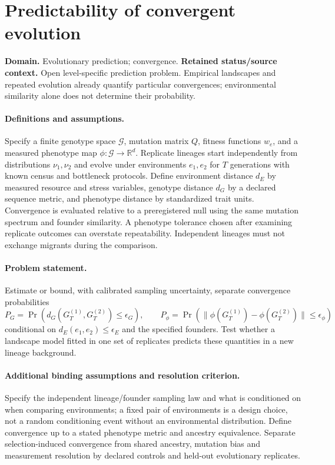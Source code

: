 \documentclass[11pt]{article}
\begin{document}
\section*{Predictability of convergent evolution}
\label{prob:158}
\label{rank:91}
\par\smallskip

\noindent\textbf{Domain.} Evolutionary prediction; convergence. \quad \textbf{Retained status/source context.} Open level-specific prediction problem. Empirical landscapes and repeated evolution already quantify particular convergences; environmental similarity alone does not determine their probability.
\paragraph{Definitions and assumptions.} Specify a finite genotype space $\mathcal G$, mutation matrix $Q$, fitness functions $w_e$, and a measured phenotype map $\phi:\mathcal G\to\mathbb{R}^d$. Replicate lineages start independently from distributions $\nu_1,\nu_2$ and evolve under environments $e_1,e_2$ for $T$ generations with known census and bottleneck protocols. Define environment distance $d_E$ by measured resource and stress variables, genotype distance $d_G$ by a declared sequence metric, and phenotype distance by standardized trait units. Convergence is evaluated relative to a preregistered null using the same mutation spectrum and founder similarity. A phenotype tolerance chosen after examining replicate outcomes can overstate repeatability. Independent lineages must not exchange migrants during the comparison.
\paragraph{Problem statement.} Estimate or bound, with calibrated sampling uncertainty, separate convergence probabilities
\[
 P_G=\Pr(d_G(G_T^{(1)},G_T^{(2)})\le\epsilon_G),\qquad
 P_\phi=\Pr(\|\phi(G_T^{(1)})-\phi(G_T^{(2)})\|\le\epsilon_\phi)
\]
conditional on $d_E(e_1,e_2)\le\epsilon_E$ and the specified founders. Test whether a landscape model fitted in one set of replicates predicts these quantities in a new lineage background.
\paragraph{Additional binding assumptions and resolution criterion.} Specify the independent lineage/founder sampling law and what is conditioned on when comparing environments; a fixed pair of environments is a design choice, not a random conditioning event without an environmental distribution. Define convergence up to a stated phenotype metric and ancestry equivalence. Separate selection-induced convergence from shared ancestry, mutation bias and measurement resolution by declared controls and held-out evolutionary replicates.
\end{document}

